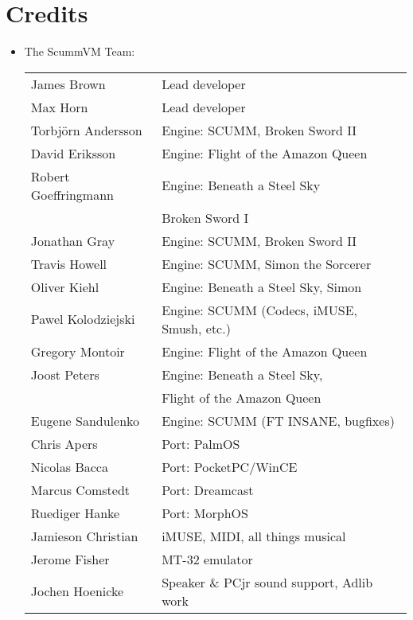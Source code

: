 

\section{Credits}
\begin{itemize}
\item The ScummVM Team:\\
  \begin{tabular}[h]{p{4cm}l}
    James Brown          & Lead developer\\
    Max Horn             & Lead developer\\
    Torbj\"{o}rn Andersson   & Engine: SCUMM, Broken Sword II\\
    David Eriksson       & Engine: Flight of the Amazon Queen\\
    Robert Goeffringmann & Engine: Beneath a Steel Sky\\
                         &         Broken Sword I\\
    Jonathan Gray        & Engine: SCUMM, Broken Sword II\\
    Travis Howell        & Engine: SCUMM, Simon the Sorcerer\\
    Oliver Kiehl         & Engine: Beneath a Steel Sky, Simon\\
    Pawel Kolodziejski   & Engine: SCUMM (Codecs, iMUSE, Smush, etc.)\\
    Gregory Montoir      & Engine: Flight of the Amazon Queen\\
    Joost Peters         & Engine: Beneath a Steel Sky,\\
                         &         Flight of the Amazon Queen\\
    Eugene Sandulenko    & Engine: SCUMM (FT INSANE, bugfixes)\\
    Chris Apers          & Port: PalmOS\\
    Nicolas Bacca        & Port: PocketPC/WinCE\\
    Marcus Comstedt      & Port: Dreamcast\\
    Ruediger Hanke       & Port: MorphOS\\
    Jamieson Christian   & iMUSE, MIDI, all things musical\\
    Jerome Fisher        & MT-32 emulator\\
    Jochen Hoenicke      & Speaker \& PCjr sound support, Adlib work\\
  \end{tabular}

\end{itemize}
